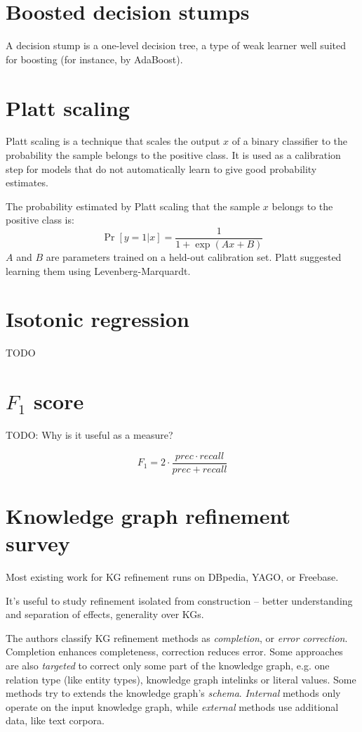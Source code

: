 \section{Boosted decision stumps}
\label{boosted-decision-stumps}
A decision stump is a one-level decision tree, a type of weak learner
well suited for boosting (for instance, by AdaBoost).

\section{Platt scaling}
\label{platt-scaling}

Platt scaling\cite{platt-scaling} is a technique that scales the output $x$ of a binary classifier
to the probability the sample belongs to the positive class. It is used as a
calibration step for models that do not automatically learn to give good
probability estimates.

The probability estimated by Platt scaling that the sample $x$ belongs to the
positive class is:
$$\Pr[y=1|x] = \frac{1}{1+\exp(Ax+B)}$$
$A$ and $B$ are parameters trained on a held-out calibration set.
Platt suggested learning them using Levenberg-Marquardt.

\section{Isotonic regression}
TODO

\section{$F_1$ score}
\label{f-1}
TODO: Why is it useful as a measure?

$$F_1 = 2\cdot\frac{prec \cdot recall}{prec + recall}$$

\section{Knowledge graph refinement survey\cite{kg-refinement-survey}}

Most existing work for KG refinement runs on DBpedia, YAGO, or Freebase.

It's useful to study refinement isolated from construction -- better
understanding and separation of effects, generality over KGs.

The authors classify KG refinement methods as \textit{completion}, or
\textit{error correction}. Completion enhances completeness, correction
reduces error.
Some approaches are also \textit{targeted} to correct only some part of the
knowledge graph, e.g. one relation type (like entity types), knowledge graph
intelinks or literal values.
Some methods try to extends the knowledge graph's \textit{schema}.
\textit{Internal} methods only operate on the input knowledge graph, while
\textit{external} methods use additional data, like text corpora.

